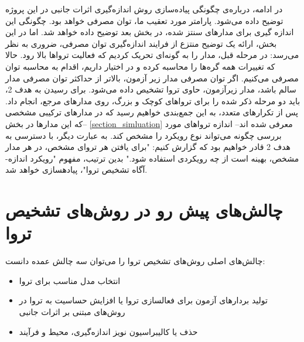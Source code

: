 در ادامه، درباره‌ی چگونگی پیاده‌سازی روش اندازه‌گیری اثرات جانبی در این پروژه  توضیح داده می‌شود. پارامتر مورد تعقیب ما، توان مصرفی خواهد بود. چگونگی این اندازه گیری برای مدارهای سنتز شده، در بخش بعد توضیح داده خواهد شد. اما در این بخش، ارائه یک توضیح منتزع از فرایند اندازه‌گیری توان مصرفی، ضروری به نظر می‌رسد:
در مرحله قبل، مدار را به گونه‌ای تحریک کردیم که فعالیت تروا‌ها بالا رود. حالا که تغییرات همه گره‌ها را محاسبه کرده و در اختیار داریم، اقدام به محاسبه توان مصرفی می‌کنیم. اگر توان مصرفی مدار زیر آزمون، بالاتر از حداکثر توان مصرفی مدار سالم باشد، مدار زیرآزمون، حاوی تروا تشخیص داده می‌شود. 
برای رسیدن به هدف 2، باید دو مرحله ذکر شده را برای تروا‌های کوچک و بزرگ، روی مدارهای مرجع، انجام داد. پس از تکرارهای متعدد، به این جمع‌بندی خواهیم رسید که در مدارهای ترکیبی مشخصی --که این مدارها در بخش \ref{section_simluation} معرفی شده اند-- اندازه تروا‌‌های مورد بررسی چگونه می‌تواند نوع رویکرد را مشخص کند. به عبارت دیگر، با دسترسی به هدف 2 قادر خواهیم بود که گزارش کنیم: "برای یافتن هر تروای مشخص، در هر مدار مشخص، بهینه است از چه رویکردی استفاده شود."
بدین ترتیب، مفهوم "رویکرد اندازه-آگاه تشخیص تروا"، پیادهسازی خواهد شد.
\section {چالش‌های پیش رو در روش‌های تشخیص تروا}
چالش‌های اصلی روش‌های تشخیص تروا را می‌توان سه چالش عمده دانست:
\begin{itemize}
	\item انتخاب مدل مناسب برای تروا
	\item تولید بردارهای آزمون برای فعالسازی تروا یا افزایش حساسیت به تروا در روش‌های مبتنی بر اثرات جانبی
	\item حذف یا کالیبراسیون نویز اندازه‌گیری، محیط و فرآیند
\end{itemize}
